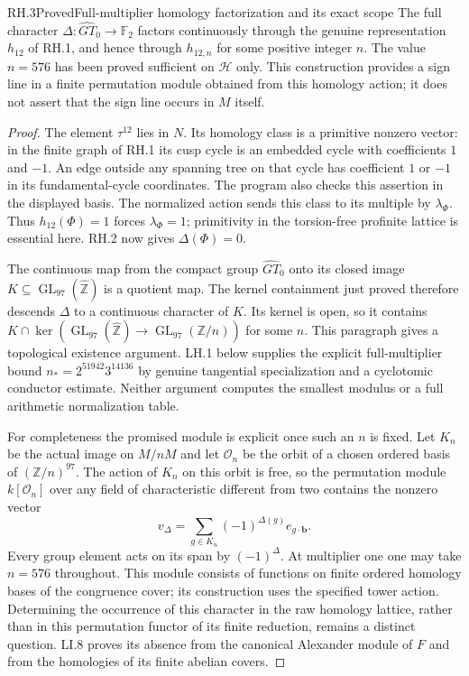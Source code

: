 \begin{statement}{RH.3}{Proved}{Full-multiplier homology factorization and its exact scope}
The full character $\Delta:\widehat{GT}_0\to\mathbb F_2$
factors continuously through the genuine representation
$h_{12}$ of RH.1, and hence through $h_{12,n}$ for some positive
integer $n$.  The value $n=576$ has been proved sufficient on
$\mathcal H$ only.  This construction provides a sign line in
a finite permutation module obtained from this homology action;
it does not assert that the sign line occurs in $M$ itself.
\end{statement}
\begin{proof}
The element $\tau^{12}$ lies in $N$. Its homology class is a
primitive nonzero vector: in the finite graph of RH.1 its
cusp cycle is an embedded cycle with coefficients $1$ and
$-1$. An edge outside any spanning tree on that cycle has
coefficient $1$ or $-1$ in its fundamental-cycle coordinates.
The program also checks this assertion in the displayed basis.
The normalized action sends this class to its multiple by
$\lambda_\Phi$. Thus $h_{12}(\Phi)=1$ forces
$\lambda_\Phi=1$; primitivity in the torsion-free profinite
lattice is essential here. RH.2 now gives $\Delta(\Phi)=0$.

The continuous map from the compact group $\widehat{GT}_0$
onto its closed image $K\subseteq\operatorname{GL}_{97}
(\widehat{\mathbb Z})$ is a quotient map. The kernel
containment just proved therefore descends $\Delta$ to a
continuous character of $K$. Its kernel is open, so it
contains $K\cap\ker(\operatorname{GL}_{97}
(\widehat{\mathbb Z})\to\operatorname{GL}_{97}
(\mathbb Z/n))$ for some $n$.
This paragraph gives a topological existence argument.
LH.1 below supplies the explicit full-multiplier bound
$n_*=2^{51942}3^{14136}$ by genuine tangential specialization
and a cyclotomic conductor estimate. Neither argument computes
the smallest modulus or a full arithmetic normalization table.

For completeness the promised module is explicit once such an
$n$ is fixed. Let $K_n$ be the actual image on $M/nM$ and let
$\mathcal O_n$ be the orbit of a chosen ordered basis of
$(\mathbb Z/n)^{97}$.  The action of $K_n$ on this orbit is
free, so the permutation module $k[\mathcal O_n]$ over any
field of characteristic different from two contains the
nonzero vector
\[
 v_\Delta=\sum_{g\in K_n}(-1)^{\Delta(g)}
                   e_{g\cdot\mathbf b}.
\]
Every group element acts on its span by $(-1)^\Delta$.
At multiplier one one may take $n=576$ throughout.
This module consists of functions on finite ordered homology
bases of the congruence cover; its construction uses the
specified tower action.  Determining the occurrence of this
character in the raw homology lattice, rather than in this
permutation functor of its finite reduction, remains a distinct
question.  LI.8 proves its absence from the canonical Alexander
module of $F$ and from the homologies of its finite abelian covers.
\end{proof}
